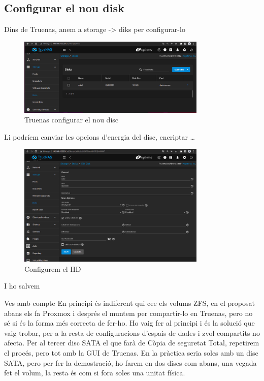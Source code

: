 \documentclass[
  10pt,
]{krantz}
\begin{document}
\hypertarget{configurar-el-nou-disk}{%
\subsection{Configurar el nou disk}\label{configurar-el-nou-disk}}

Dins de Truenas, anem a storage -\textgreater{} diks per configurar-lo

\begin{figure}
\centering
\includegraphics[width=0.8\textwidth,height=\textheight]{imatges/proxmox/truenas_nou_disc.png}
\caption{Truenas configurar el nou disc}
\end{figure}

Li podríem canviar les opcions d'energia del disc, encriptar \ldots{}

\begin{figure}
\centering
\includegraphics[width=0.8\textwidth,height=\textheight]{imatges/proxmox/truenas_param_hd.png}
\caption{Configurem el HD}
\end{figure}

I ho salvem

\begin{rmdcuidao}{Ves amb compte}
En principi és indiferent qui cee els volums ZFS, en el proposat abans els fa Proxmox i després el muntem per compartir-lo en Truenas, pero no sé si és la forma més correcta de fer-ho. Ho vaig fer al principi i és la solució que vaig trobar, per a la resta de configuracions d'espais de dades i zvol compartits no afecta. Per al tercer disc SATA el que farà de Còpia de seguretat Total, repetirem el procés, pero tot amb la GUI de Truenas. En la pràctica seria soles amb un disc SATA, pero per fer la demostració, ho farem en dos discs com abans, una vegada fet el volum, la resta és com si fora soles una unitat física.

\end{rmdcuidao}
\end{document}
